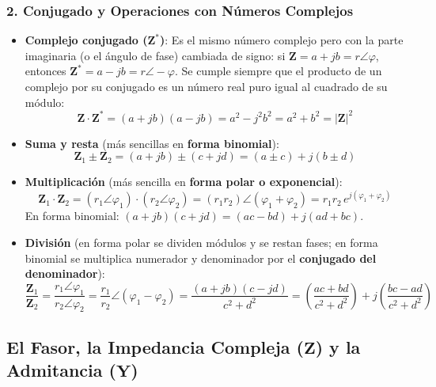 \subsubsection{2. Conjugado y Operaciones con Números Complejos}
\begin{itemize}
    \item \textbf{Complejo conjugado ($\mathbf{Z}^*$)}: Es el mismo número complejo pero con la parte imaginaria (o el ángulo de fase) cambiada de signo: si $\mathbf{Z} = a + jb = r\angle\varphi$, entonces $\mathbf{Z}^* = a - jb = r\angle -\varphi$. Se cumple siempre que el producto de un complejo por su conjugado es un número real puro igual al cuadrado de su módulo:
    \begin{equation}
        \mathbf{Z}\cdot\mathbf{Z}^* = (a + jb)(a - jb) = a^2 - j^2 b^2 = a^2 + b^2 = |\mathbf{Z}|^2
    \end{equation}
    \item \textbf{Suma y resta} (más sencillas en \textbf{forma binomial}):
    \begin{equation}
        \mathbf{Z}_1 \pm \mathbf{Z}_2 = (a + jb) \pm (c + jd) = (a \pm c) + j(b \pm d)
    \end{equation}
    \item \textbf{Multiplicación} (más sencilla en \textbf{forma polar o exponencial}):
    \begin{equation}
        \mathbf{Z}_1 \cdot \mathbf{Z}_2 = (r_1\angle\varphi_1)\cdot(r_2\angle\varphi_2) = (r_1 r_2)\angle(\varphi_1 + \varphi_2) = r_1 r_2\,e^{j(\varphi_1 + \varphi_2)}
    \end{equation}
    En forma binomial: $(a+jb)(c+jd) = (ac - bd) + j(ad + bc)$.
    \item \textbf{División} (en forma polar se dividen módulos y se restan fases; en forma binomial se multiplica numerador y denominador por el \textbf{conjugado del denominador}):
    \begin{equation}
        \frac{\mathbf{Z}_1}{\mathbf{Z}_2} = \frac{r_1\angle\varphi_1}{r_2\angle\varphi_2} = \frac{r_1}{r_2}\angle(\varphi_1 - \varphi_2) = \frac{(a+jb)(c-jd)}{c^2 + d^2} = \left(\frac{ac + bd}{c^2 + d^2}\right) + j\left(\frac{bc - ad}{c^2 + d^2}\right)
    \end{equation}
\end{itemize}

\subsection{El Fasor, la Impedancia Compleja ($\mathbf{Z}$) y la Admitancia ($\mathbf{Y}$)}

